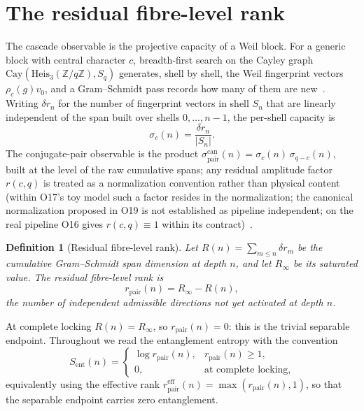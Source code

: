 \documentclass[11pt]{article}
\newtheorem{definition}{Definition}
\newcommand{\Heis}{\mathrm{Heis}}
\newcommand{\Cay}{\mathrm{Cay}}
\newcommand{\Sent}{S_{\mathrm{ent}}}
\newcommand{\rpair}{r_{\mathrm{pair}}}
\newcommand{\spair}{\sigma^{\mathrm{can}}_{\mathrm{pair}}}
\begin{document}
  \section{The residual fibre-level rank}
    \label{sec:rank}

    The cascade observable is the projective capacity of a Weil block.
    For a generic block with central character $c$, breadth-first search on the Cayley graph
    $\Cay(\Heis_3(\mathbb{Z}/q\mathbb{Z}),S_q)$ generates, shell by shell, the Weil fingerprint vectors
    $\rho_c(g)v_0$, and a Gram--Schmidt pass records how many of them are new~\cite{Beau2026a15,Beau2026a16}.
    Writing $\delta r_n$ for the number of fingerprint vectors in shell $S_n$ that are linearly independent of
    the span built over shells $0,\dots,n-1$, the per-shell capacity is
    \[
      \sigma_c(n)=\frac{\delta r_n}{|S_n|}.
    \]
    The conjugate-pair observable is the product
    $\spair(n)=\sigma_c(n)\,\sigma_{q-c}(n)$, built at the level of the raw cumulative spans; any
    residual amplitude factor $r(c,q)$ is treated as a normalization convention rather than physical
    content (within O17's toy model such a factor resides in the normalization; the canonical
    normalization proposed in O19 is not established as pipeline independent; on the real pipeline O16 gives $r(c,q) \equiv 1$
    within its contract)~\cite{Beau2026a20,Beau2026a21,Beau2026a23}.

    \begin{definition}[Residual fibre-level rank]
      \label{def:rank}
      Let $R(n)=\sum_{m\le n}\delta r_m$ be the cumulative Gram--Schmidt span dimension at depth $n$, and let
      $R_\infty$ be its saturated value.
      The residual fibre-level rank is
      \[
        \rpair(n)=R_\infty-R(n),
      \]
      the number of independent admissible directions not yet activated at depth $n$.
    \end{definition}

    At complete locking $R(n)=R_\infty$, so $\rpair(n)=0$: this is the trivial separable endpoint.
    Throughout we read the entanglement entropy with the convention
    \[
      \Sent(n)=
      \begin{cases}
        \log \rpair(n), & \rpair(n)\ge 1,\\
        0,              & \text{at complete locking,}
      \end{cases}
    \]
    equivalently using the effective rank $\rpair^{\mathrm{eff}}(n)=\max(\rpair(n),1)$, so that the separable
    endpoint carries zero entanglement.
\end{document}
